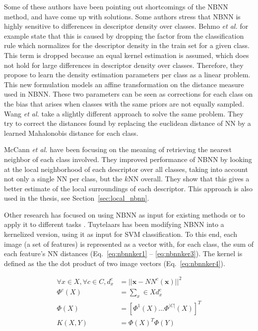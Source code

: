 Some of these authors have been pointing out shortcomings of the NBNN method, and have come up with solutions. \cite{behmo2010towards, mccann2012local,timofte2012iterative,wang2011improved} Some authors \cite{behmo2010towards,wang2011improved} stress that NBNN is highly sensitive to differences in descriptor density over classes. Behmo \emph{et al.} for example state that this is caused by dropping the factor from the classification rule which normalizes for the descriptor density in the train set for a given class. This term is dropped because an equal kernel estimation is assumed, which does not hold for large differences in descriptor density over classes. \cite{behmo2010towards} Therefore, they propose to learn the density estimation parameters per class as a linear problem. This new formulation models an affine transformation on the distance measure used in NBNN. These two parameters can be seen as corrections for each class on the bias that arises when classes with the same priors are not equally sampled. Wang \emph{et al.} \cite{wang2011improved} take a slightly different approach to solve the same problem. They try to correct the distances found by replacing the euclidean distance of NN by a learned Mahalonobis distance for each class.

McCann \emph{et al.} \cite{mccann2012local} have been focusing on the meaning of retrieving the nearest neighbor of each class involved. They improved performance of NBNN by looking at the local neighborhood of each descriptor over all classes, taking into account not only a single NN per class, but the $k$NN overall. They show that this gives a better estimate of the local surroundings of each descriptor. This approach is also used in the thesis, see Section~\ref{sec:local_nbnn}.

Other research has focused on using NBNN as input for existing methods \cite{tuytelaars2011nbnn} or to apply it to different tasks \cite{becker2012codebook}. Tuytelaars has been modifying NBNN into a kernelized version, using it as input for SVM classification. To this end, each image (a set of features) is represented as a vector with, for each class, the sum of each feature's NN distances (Eq.~\eqref{eq:nbnnker1} -- \eqref{eq:nbnnker3}). The kernel is defined as the the dot product of two image vectors (Eq.~\eqref{eq:nbnnker4}).

\begin{align}
    \forall x \in X, \forall c \in C, d_x^c &= ||\mathbf{x} - NN^c(\mathbf{x})||^2 \label{eq:nbnnker1}\\
    \Phi^c(X) &= \sum_x\in X d_x^c \label{eq:nbnnker2}\\
    \Phi(X) &= [\Phi^1(X) \ldots \Phi^{|C|}(X)]^T \label{eq:nbnnker3}\\
    K(X,Y) &= \Phi(X)^T \Phi(Y) \label{eq:nbnnker4}
\end{align}

